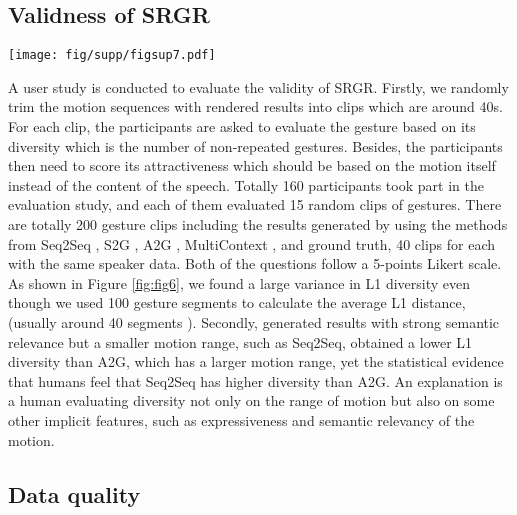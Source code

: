 \documentclass[runningheads]{llncs}
\begin{document}
\subsection{Validness of SRGR}
\begin{figure*}[]

\begin{center}
\texttt{[image: fig/supp/figsup7.pdf]}
\end{center}
\vspace{-0.5cm}
\caption{\textbf{Comparison of Metrics by Group.} SRGR shows the consistence with human perception, and lower variance comparing with L1 Diversity in evaluation.}
\vspace{-0.5cm}
\label{fig:fig6}
\end{figure*}

%
 
A user study is conducted to evaluate the validity of SRGR. 
Firstly, we randomly trim the motion sequences with rendered results into clips which are around 40s. 
For each clip, the participants are asked to evaluate the gesture based on its diversity which is the number of non-repeated gestures. 
Besides, the participants then need to score its attractiveness which should be based on the motion itself instead of the content of the speech.
Totally 160 participants took part in the evaluation study, and each of them evaluated 15 random clips of gestures. There are totally 200 gesture clips including the results generated by using the methods from Seq2Seq \cite{yoon2019robots}, S2G \cite{ginosar2019learning}, A2G \cite{li2021audio2gestures},  MultiContext \cite{yoon2020speech}, and ground truth, 40 clips for each with the same speaker data. Both of the questions follow a 5-points Likert scale. As shown in Figure \ref{fig:fig6}, we found a large variance in L1 diversity even though we used 100 gesture segments to calculate the average L1 distance, (usually around 40 segments \cite{li2021ai,li2021audio2gestures}). Secondly, generated results with strong semantic relevance but a smaller motion range, such as Seq2Seq, obtained a lower L1 diversity than A2G, which has a larger motion range, yet the statistical evidence that humans feel that Seq2Seq has higher diversity than A2G. An explanation is a human evaluating diversity not only on the range of motion but also on some other implicit features, such as expressiveness and semantic relevancy of the motion.




\subsection{Data quality}
\end{document}

